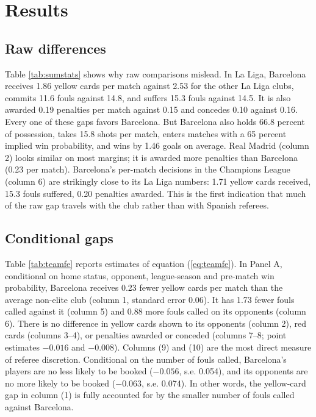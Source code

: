 \section{Results}\label{sec:results}

\subsection{Raw differences}

Table \ref{tab:sumstats} shows why raw comparisons mislead. In La Liga, Barcelona receives 1.86 yellow cards per match against 2.53 for the other La Liga clubs, commits 11.6 fouls against 14.8, and suffers 15.3 fouls against 14.5. It is also awarded 0.19 penalties per match against 0.15 and concedes 0.10 against 0.16. Every one of these gaps favors Barcelona. But Barcelona also holds 66.8 percent of possession, takes 15.8 shots per match, enters matches with a 65 percent implied win probability, and wins by 1.46 goals on average. Real Madrid (column 2) looks similar on most margins; it is awarded more penalties than Barcelona (0.23 per match). Barcelona's per-match decisions in the Champions League (column 6) are strikingly close to its La Liga numbers: 1.71 yellow cards received, 15.3 fouls suffered, 0.20 penalties awarded. This is the first indication that much of the raw gap travels with the club rather than with Spanish referees.

\subsection{Conditional gaps}

Table \ref{tab:teamfe} reports estimates of equation (\ref{eq:teamfe}). In Panel A, conditional on home status, opponent, league-season and pre-match win probability, Barcelona receives 0.23 fewer yellow cards per match than the average non-elite club (column 1, standard error 0.06). It has 1.73 fewer fouls called against it (column 5) and 0.88 more fouls called on its opponents (column 6). There is no difference in yellow cards shown to its opponents (column 2), red cards (columns 3--4), or penalties awarded or conceded (columns 7--8; point estimates $-0.016$ and $-0.008$). Columns (9) and (10) are the most direct measure of referee discretion. Conditional on the number of fouls called, Barcelona's players are no less likely to be booked ($-0.056$, s.e. 0.054), and its opponents are no more likely to be booked ($-0.063$, s.e. 0.074). In other words, the yellow-card gap in column (1) is fully accounted for by the smaller number of fouls called against Barcelona.

